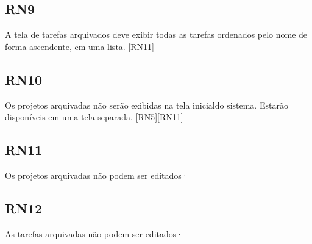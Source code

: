 \subsection{RN9}

A tela de tarefas arquivados deve exibir todas as tarefas ordenados pelo nome de forma ascendente, em uma lista. [RN11]

\subsection{RN10}

Os projetos arquivadas não serão exibidas na tela inicialdo sistema. Estarão disponíveis em uma tela separada. [RN5][RN11]

\subsection{RN11}

Os projetos arquivadas não podem ser editados·

\subsection{RN12}

As tarefas arquivadas não podem ser editados·
